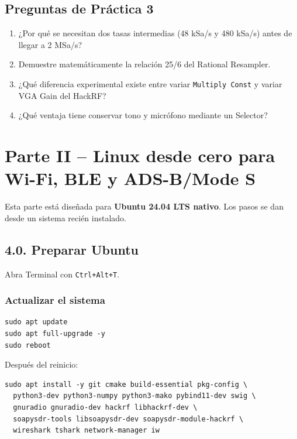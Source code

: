 \subsection{Preguntas de Práctica 3}

\begin{enumerate}
    \item ¿Por qué se necesitan dos tasas intermedias (48 kSa/s y 480 kSa/s) antes de llegar a 2 MSa/s?
    \item Demuestre matemáticamente la relación 25/6 del Rational Resampler.
    \item ¿Qué diferencia experimental existe entre variar \texttt{Multiply Const} y variar VGA Gain del HackRF?
    \item ¿Qué ventaja tiene conservar tono y micrófono mediante un Selector?
\end{enumerate}

\clearpage
\section{Parte II -- Linux desde cero para Wi-Fi, BLE y ADS-B/Mode S}

Esta parte está diseñada para \textbf{Ubuntu 24.04 LTS nativo}. Los pasos se dan desde un sistema recién instalado.

\subsection{4.0. Preparar Ubuntu}

Abra Terminal con \texttt{Ctrl+Alt+T}.

\subsubsection{Actualizar el sistema}

\begin{lstlisting}
sudo apt update
sudo apt full-upgrade -y
sudo reboot
\end{lstlisting}

Después del reinicio:

\begin{lstlisting}
sudo apt install -y git cmake build-essential pkg-config \
  python3-dev python3-numpy python3-mako pybind11-dev swig \
  gnuradio gnuradio-dev hackrf libhackrf-dev \
  soapysdr-tools libsoapysdr-dev soapysdr-module-hackrf \
  wireshark tshark network-manager iw
\end{lstlisting}

